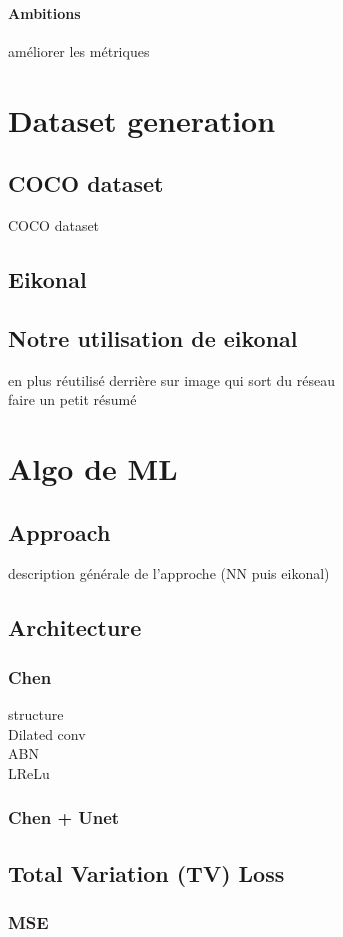\documentclass{article}
\begin{document}
\paragraph{Ambitions}
améliorer les métriques


\section{Dataset generation}
\subsection{COCO dataset}
COCO dataset
\subsection{Eikonal}
\subsection{Notre utilisation de eikonal}
en plus réutilisé derrière sur image qui sort du réseau\\
faire un petit résumé

\section{Algo de ML}
\subsection{Approach}
description générale de l'approche (NN puis eikonal)
\subsection{Architecture}
\subsubsection{Chen}
structure\\
Dilated conv\\
ABN\\
LReLu
\subsubsection{Chen + Unet}

\subsection{Total Variation (TV) Loss}
\subsubsection{MSE}
\end{document}
